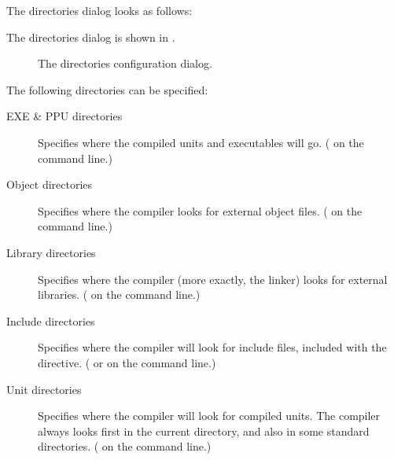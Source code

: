 \begin{htmlonly}
The directories dialog looks as follows:
\end{htmlonly}
\begin{latexonly}
The directories dialog is shown in .
\begin{figure}[ht]
\begin{center}
\caption{The directories configuration dialog.}\label{fig:odirs}
\ifpdf
{}
\else
{}
\fi
\end{center}
\end{figure}
\end{latexonly}
The following directories can be specified:
\begin{description}
\item[EXE \& PPU directories] Specifies where the compiled units and
executables will go. ( on the command line.)
\item[Object directories] Specifies where the compiler looks for external
object files. ( on the command line.)
\item[Library directories] Specifies where the compiler (more exactly, the
linker) looks for external libraries. ( on the command line.)
\item[Include directories] Specifies where the compiler will look for 
include files, included with the  directive. 
( or  on the command line.)
\item[Unit directories] Specifies where the compiler will look for compiled
units. The compiler always looks first in the current directory, and also in
some standard directories. ( on the command line.)
\end{description}
%
%
